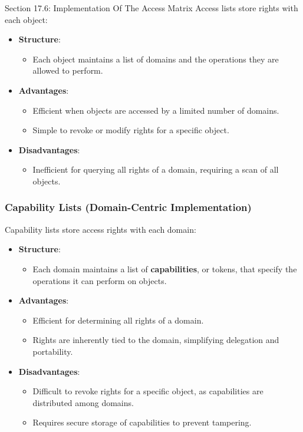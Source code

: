 \begin{notes}{Section 17.6: Implementation Of The Access Matrix}
    Access lists store rights with each object:
    \begin{itemize}
        \item \textbf{Structure}:
        \begin{itemize}
            \item Each object maintains a list of domains and the operations they are allowed to perform.
        \end{itemize}
        \item \textbf{Advantages}:
        \begin{itemize}
            \item Efficient when objects are accessed by a limited number of domains.
            \item Simple to revoke or modify rights for a specific object.
        \end{itemize}
        \item \textbf{Disadvantages}:
        \begin{itemize}
            \item Inefficient for querying all rights of a domain, requiring a scan of all objects.
        \end{itemize}
    \end{itemize}
    
    \subsubsection*{Capability Lists (Domain-Centric Implementation)}
    
    Capability lists store access rights with each domain:
    \begin{itemize}
        \item \textbf{Structure}:
        \begin{itemize}
            \item Each domain maintains a list of \textbf{capabilities}, or tokens, that specify the operations it can perform on objects.
        \end{itemize}
        \item \textbf{Advantages}:
        \begin{itemize}
            \item Efficient for determining all rights of a domain.
            \item Rights are inherently tied to the domain, simplifying delegation and portability.
        \end{itemize}
        \item \textbf{Disadvantages}:
        \begin{itemize}
            \item Difficult to revoke rights for a specific object, as capabilities are distributed among domains.
            \item Requires secure storage of capabilities to prevent tampering.
        \end{itemize}
    \end{itemize}
    

\end{notes}
